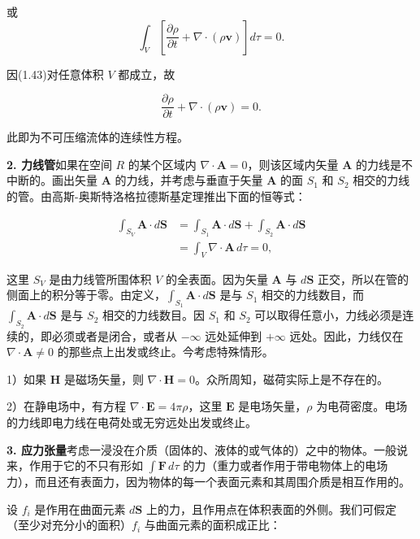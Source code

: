\documentclass[11pt,a4paper,oneside]{ctexbook}
\newcommand{\ve}[1]{\bm{#1}}
\begin{document}
或
\begin{equation}
\int_{V} \left[\frac{\partial\rho}{\partial t} + \nabla \cdot (\rho\ve{v})\right] d\tau = 0.
\tag{1.43}
\end{equation}

因(1.43)对任意体积 $V$ 都成立，故

\begin{equation*}
\frac{\partial\rho}{\partial t} + \nabla \cdot (\rho\ve{v}) = 0.
\end{equation*}

此即为不可压缩流体的连续性方程。

\textbf{2. 力线管}\quad 如果在空间 $R$ 的某个区域内 $\nabla \cdot \ve{A} = 0$，则该区域内矢量 $\ve{A}$ 的力线是不中断的。画出矢量 $\ve{A}$ 的力线，并考虑与垂直于矢量 $\ve{A}$ 的面 $S_1$ 和 $S_2$ 相交的力线的管。由高斯-奥斯特洛格拉德斯基定理推出下面的恒等式：

\begin{equation*}
\begin{aligned}
\int_{S_V} \ve{A} \cdot d\ve{S} &= \int_{S_1} \ve{A} \cdot d\ve{S} + \int_{S_2} \ve{A} \cdot d\ve{S}\\
&= \int_{V} \nabla \cdot \ve{A}\, d\tau = 0,
\end{aligned}
\end{equation*}

这里 $S_V$ 是由力线管所围体积 $V$ 的全表面。因为矢量 $\ve{A}$ 与 $d\ve{S}$ 正交，所以在管的侧面上的积分等于零。由定义，$\int_{S_1} \ve{A} \cdot d\ve{S}$ 是与 $S_1$ 相交的力线数目，而 $\int_{S_2} \ve{A} \cdot d\ve{S}$ 是与 $S_2$ 相交的力线数目。因 $S_1$ 和 $S_2$ 可以取得任意小，力线必须是连续的，即必须或者是闭合，或者从 $-\infty$ 远处延伸到 $+\infty$ 远处。因此，力线仅在 $\nabla \cdot \ve{A} \neq 0$ 的那些点上出发或终止。今考虑特殊情形。

1）如果 $\ve{H}$ 是磁场矢量，则 $\nabla \cdot \ve{H} = 0$。众所周知，磁荷实际上是不存在的。

2）在静电场中，有方程 $\nabla \cdot \ve{E} = 4\pi\rho$，这里 $\ve{E}$ 是电场矢量，$\rho$ 为电荷密度。电场的力线即电力线在电荷处或无穷远处出发或终止。

\textbf{3. 应力张量}\quad 考虑一浸没在介质（固体的、液体的或气体的）之中的物体。一般说来，作用于它的不只有形如 $\int \ve{F}\, d\tau$ 的力（重力或者作用于带电物体上的电场力），而且还有表面力，因为物体的每一个表面元素和其周围介质是相互作用的。

设 $f_i$ 是作用在曲面元素 $d\ve{S}$ 上的力，且作用点在体积表面的外侧。我们可假定（至少对充分小的面积）$f_i$ 与曲面元素的面积成正比：
\end{document}
